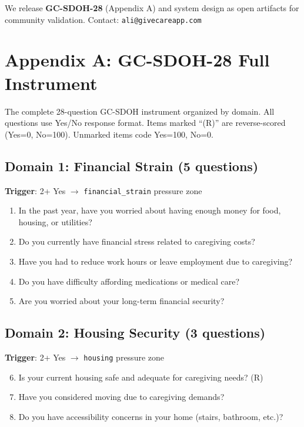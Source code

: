 \documentclass{article}
\begin{document}
We release \textbf{GC-SDOH-28} (Appendix A) and system design as open artifacts for community validation. Contact: \texttt{ali@givecareapp.com}

%
\section*{Appendix A: GC-SDOH-28 Full Instrument}

The complete 28-question GC-SDOH instrument organized by domain. All questions use Yes/No response format. Items marked ``(R)'' are reverse-scored (Yes=0, No=100). Unmarked items code Yes=100, No=0.

\subsection*{Domain 1: Financial Strain (5 questions)}
\textbf{Trigger}: 2+ Yes $\rightarrow$ \texttt{financial\_strain} pressure zone

\begin{enumerate}
    \item In the past year, have you worried about having enough money for food, housing, or utilities?
    \item Do you currently have financial stress related to caregiving costs?
    \item Have you had to reduce work hours or leave employment due to caregiving?
    \item Do you have difficulty affording medications or medical care?
    \item Are you worried about your long-term financial security?
\end{enumerate}

\subsection*{Domain 2: Housing Security (3 questions)}
\textbf{Trigger}: 2+ Yes $\rightarrow$ \texttt{housing} pressure zone

\begin{enumerate}
    \setcounter{enumi}{5}
    \item Is your current housing safe and adequate for caregiving needs? (R)
    \item Have you considered moving due to caregiving demands?
    \item Do you have accessibility concerns in your home (stairs, bathroom, etc.)?
\end{enumerate}
\end{document}
